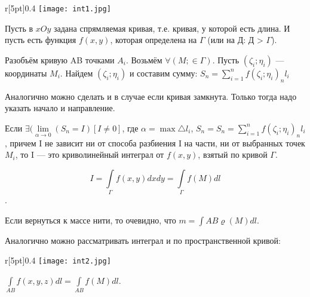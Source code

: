 \begin{wrapfigure}{r}[5pt]{0.4\textwidth}
	\texttt{[image: int1.jpg]}
\end{wrapfigure}

Пусть в $xOy$ задана спрямляемая кривая, т.е. кривая, у которой есть длина.
И пусть есть функция $f(x,y)$, которая определена на $\Gamma$ (или на Д: Д > $\Gamma$).


Разобъём кривую AB точками $A_i$.
Возьмём $\forall(M;\in \Gamma)$.
Пусть $(\zeta_i;\eta_i )$ --- координаты $M_i$.
Найдем $(\zeta_i;\eta_i )$ и составим сумму: $S_n = \sum^{n}_{i=1} {f(\zeta_i;\eta_i )}_n l_i$

Аналогично можно сделать и в случае если кривая замкнута. Только тогда надо указать начало и направление.

\opred
Если $\exists (\lim\limits_{\alpha \rightarrow 0}(S_n = I) [I \ne 0]$, где $\alpha = \max \triangle l_i$, $S_n = S_n = \sum^{n}_{i=1} {f(\zeta_i;\eta_i )}_n l_i$,
причем I не зависит ни от способа разбиения I на части, ни от выбранных точек $M_i$, то I --- это криволинейный интеграл от $f(x,y)$, взятый по кривой $\Gamma$.
\opred


$$ I = \int\limits_{\Gamma}f(x,y)dxdy = \int\limits_{\Gamma}f(M)dl$$.


Если вернуться к массе нити, то очевидно, что $m=\int\limits{AB}\varrho(M)dl$.

Аналогично можно рассматривать интеграл и по пространственной кривой:

\begin{wrapfigure}{r}[5pt]{0.4\textwidth}
	\texttt{[image: int2.jpg]}
\end{wrapfigure}

$\int\limits_{AB}f(x,y,z)dl = \int\limits_{AB}f(M)dl$.

